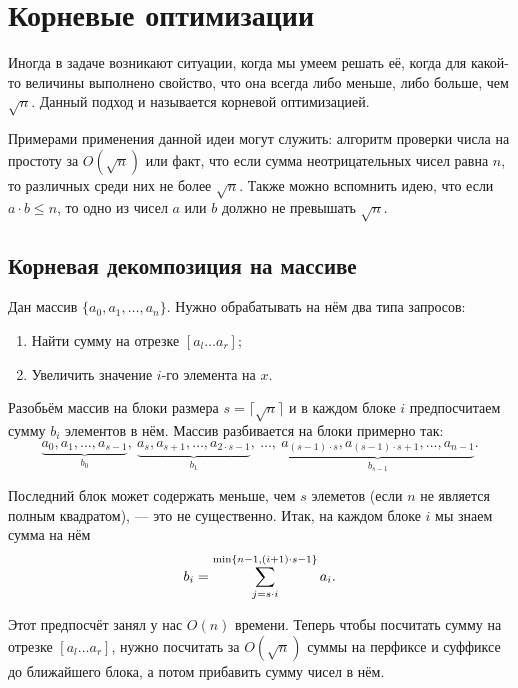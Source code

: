 \section{Корневые оптимизации}

Иногда в задаче возникают ситуации, когда мы умеем решать её, когда для какой-то величины выполнено свойство, что она всегда либо меньше, либо больше, чем $\sqrt{n}$. Данный подход и называется корневой оптимизацией.

Примерами применения данной идеи могут служить: алгоритм проверки числа на простоту за $O(\sqrt{n})$ или факт, что если сумма неотрицательных чисел равна $n$, то различных среди них не более $\sqrt{n}$. Также можно вспомнить идею, что если $a \cdot b \leqslant n$, то одно из чисел $a$ или $b$ должно не превышать $\sqrt{n}$.

\subsection{Корневая декомпозиция на массиве}

\begin{problem}
    Дан массив $\{a_0, a_1, \ldots, a_n\}$. Нужно обрабатывать на нём два типа запросов:
    \begin{enumerate}[nolistsep]
        \item Найти сумму на отрезке $[a_l\ldots a_r]$;
        \item Увеличить значение $i$-го элемента на $x$.
    \end{enumerate}
\end{problem}

Разобьём массив на блоки размера $s = \lceil\sqrt{n}\rceil$ и в каждом блоке $i$ предпосчитаем сумму $b_i$ элементов в нём. Массив разбивается на блоки примерно так:
\[
    \underbrace{a_0, a_1, \ldots, a_{s - 1}}_{b_0},\ \underbrace{a_s, a_{s + 1}, \ldots, a_{2 \cdot s - 1}}_{b_1},\ \ldots,\ \underbrace{a_{(s - 1) \cdot s}, a_{(s - 1) \cdot s + 1}, \ldots, a_{n - 1}}_{b_{s - 1}}.
\]

Последний блок может содержать меньше, чем $s$ элеметов (если $n$ не является полным квадратом), --- это не существенно. Итак, на каждом блоке $i$ мы знаем сумма на нём
\[
    b_i = \displaystyle\sum_{j = s \cdot i}^{\min\{n - 1, (i + 1) \cdot s - 1\}}a_i.
\]

Этот предпосчёт занял у нас $O(n)$ времени. Теперь чтобы посчитать сумму на отрезке $[a_l\ldots a_r]$, нужно посчитать за $O(\sqrt{n})$ суммы на перфиксе и суффиксе до ближайшего блока, а потом прибавить сумму чисел в нём.

